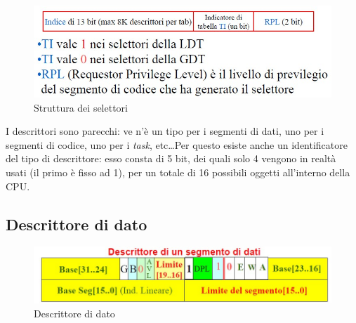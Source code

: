 \begin{figure}[!h]
\centering
\includegraphics[width=0.75\columnwidth]{img/strutturaSelettori}
\caption{Struttura dei selettori}
\label{fig:strutturaSelettori}
\end{figure}

I descrittori sono parecchi: ve n'è un tipo per i segmenti di dati, uno per i segmenti di codice, uno per i \textit{task}, etc\ldots Per questo esiste anche un identificatore del tipo di descrittore: esso consta di 5 bit, dei quali solo 4 vengono in realtà usati (il primo è fisso ad 1), per un totale di 16 possibili oggetti all'interno della CPU.

\subsection{Descrittore di dato}
\label{sec:descrittoreDato}

\begin{figure}[!h]
\centering
\includegraphics[width=0.75\columnwidth]{img/segDati}
\caption{Descrittore di dato}
\label{fig:segDati}
\end{figure}

